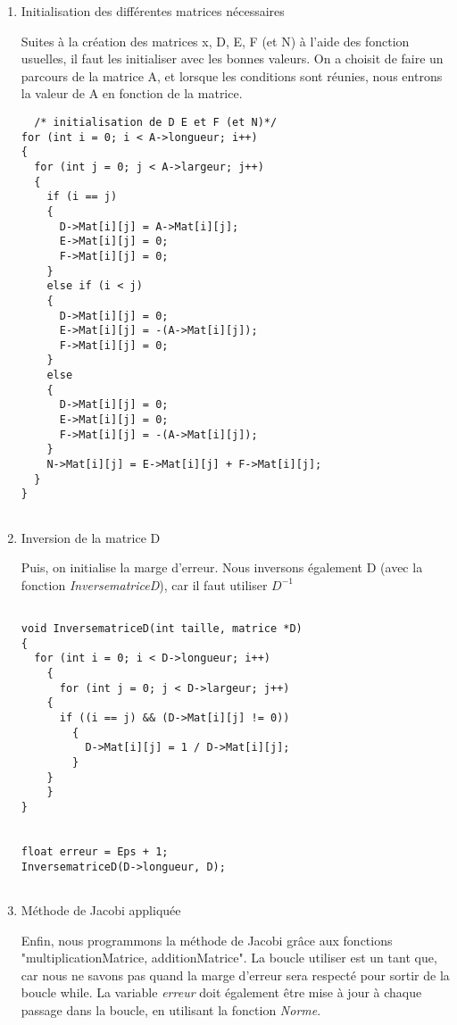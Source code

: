 \documentclass[letter]{article}
\begin{document}
\begin{enumerate}
\item Initialisation des différentes matrices nécessaires
\label{sec:org4a9afa7}

Suites à la création des matrices x, D, E, F (et N) à l'aide des fonction usuelles, il faut les initialiser avec les bonnes valeurs. On a choisit de faire un parcours de la matrice A, et lorsque les conditions sont réunies, nous entrons la valeur de A en fonction de la matrice.

\begin{verbatim}
  /* initialisation de D E et F (et N)*/
for (int i = 0; i < A->longueur; i++)
{
  for (int j = 0; j < A->largeur; j++)
  {
    if (i == j)
    {
      D->Mat[i][j] = A->Mat[i][j];
      E->Mat[i][j] = 0;
      F->Mat[i][j] = 0;
    }
    else if (i < j)
    {
      D->Mat[i][j] = 0;
      E->Mat[i][j] = -(A->Mat[i][j]);
      F->Mat[i][j] = 0;
    }
    else
    {
      D->Mat[i][j] = 0;
      E->Mat[i][j] = 0;
      F->Mat[i][j] = -(A->Mat[i][j]);
    }
    N->Mat[i][j] = E->Mat[i][j] + F->Mat[i][j];
  }
}


\end{verbatim}



\item Inversion de la matrice D
\label{sec:org7650b42}

Puis, on initialise la marge d'erreur. Nous inversons également D (avec la fonction \emph{InversematriceD}), car il faut utiliser \(D^{-1}\)


\begin{verbatim}

void InversematriceD(int taille, matrice *D)
{
  for (int i = 0; i < D->longueur; i++)
    {
      for (int j = 0; j < D->largeur; j++)
	{
	  if ((i == j) && (D->Mat[i][j] != 0))
	    {
	      D->Mat[i][j] = 1 / D->Mat[i][j];
	    }
	}
    }
}


float erreur = Eps + 1;
InversematriceD(D->longueur, D);


\end{verbatim}




\item Méthode de Jacobi appliquée
\label{sec:org0ca3fcd}

Enfin, nous programmons la méthode de Jacobi grâce aux fonctions "multiplicationMatrice, additionMatrice".
La boucle utiliser est un tant que, car nous ne savons pas quand la marge d'erreur sera respecté pour sortir de la boucle while.
La variable \emph{erreur} doit également être mise à jour à chaque passage dans la boucle, en utilisant la fonction \emph{Norme}.




\end{enumerate}
\end{document}
